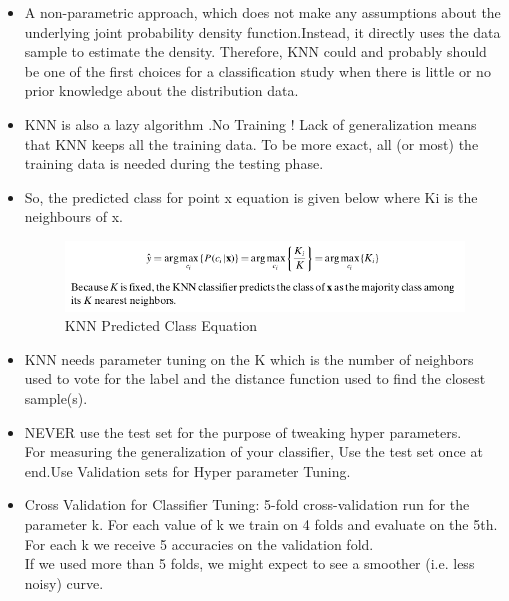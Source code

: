 \begin{itemize}
\item A non-parametric approach, which does
not make any assumptions about the underlying joint probability density function.Instead, it directly uses the data sample to estimate the density. Therefore, KNN could and probably should be one of the first choices for a classification study when there is little or no prior knowledge about the distribution data.
\item KNN is also a lazy algorithm .No Training ! Lack of generalization means that KNN keeps all the training data. To be more exact, all (or most) the training data is needed during the testing phase.
\item So, the predicted class for point x equation is given below where Ki is the neighbours of x.
\begin{figure}[H]
\centerline{\includegraphics[width=1.2\textwidth]{Figures/knn.png}}
\caption{\label{fig:figure17}KNN Predicted Class Equation}
\end{figure}
\item KNN needs parameter tuning on the K which is the number of neighbors used to vote for the label and the distance function used to find the closest sample(s).
\item NEVER use the test set for the purpose of tweaking hyper parameters.\\For measuring the generalization of your classifier, Use the test set once at end.Use Validation sets for Hyper parameter Tuning.
\item Cross Validation for Classifier Tuning: 5-fold cross-validation run for the parameter k. For each value of k we train on 4 folds and evaluate on the 5th. For each k we receive 5 accuracies on the validation fold.\\
If we used more than 5 folds, we might expect to see a smoother (i.e. less noisy) curve.
\end{itemize}